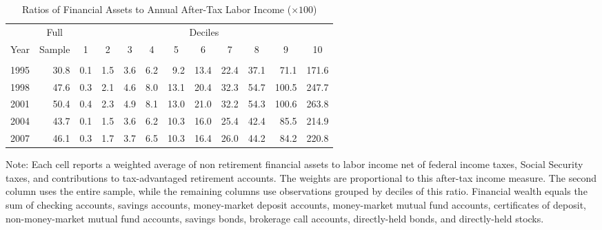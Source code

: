 \documentclass[fleqccn,12pt]{article}
\begin{document}
\begin{table} \begin{center}

\begin{tabular}[c]{lrrrrrrrrrrr}
& \multicolumn{1}{c}{Full} &\multicolumn{10}{c}{Deciles}\\
\multicolumn{1}{c}{Year} &\multicolumn{1}{c}{Sample} & \multicolumn{1}{c}{1} & \multicolumn{1}{c}{2} & \multicolumn{1}{c}{3} & \multicolumn{1}{c}{4} & \multicolumn{1}{c}{5} & \multicolumn{1}{c}{6} & \multicolumn{1}{c}{7} & \multicolumn{1}{c}{8} & \multicolumn{1}{c}{9} & \multicolumn{1}{c}{10} \\  \hline
\\ 
1995&30.8&0.1&1.5&3.6&6.2&9.2&13.4&22.4&37.1&71.1&171.6\\
1998&47.6&0.3&2.1&4.6&8.0&13.1&20.4&32.3&54.7&100.5&247.7\\
2001&50.4&0.4&2.3&4.9&8.1&13.0&21.0&32.2&54.3&100.6&263.8\\
2004&43.7&0.1&1.5&3.6&6.2&10.3&16.0&25.4&42.4&85.5&214.9\\
2007&46.1&0.3&1.7&3.7&6.5&10.3&16.4&26.0&44.2&84.2&220.8\\

\end{tabular}
\bigskip

\caption{Ratios of Financial Assets to Annual After-Tax Labor Income ($\times 100$)\label{wealthRatioTable}}

\bigskip

\footnotesize
\begin{minipage}[c]{5.5in}
\noindent Note: Each cell reports a weighted average of non retirement financial assets to labor income net of federal income taxes, Social Security taxes, and contributions to tax-advantaged retirement accounts. The weights are proportional to this after-tax income measure. The second column uses the entire sample, while the remaining columns use observations grouped by deciles of this ratio. Financial wealth equals  the sum of checking accounts, savings accounts, money-market deposit accounts, money-market mutual fund accounts, certificates of deposit, non-money-market mutual fund accounts, savings bonds, brokerage call accounts, directly-held bonds, and directly-held stocks.
\normalsize
\end{minipage}
\end{center}
\end{table}
\end{document}
